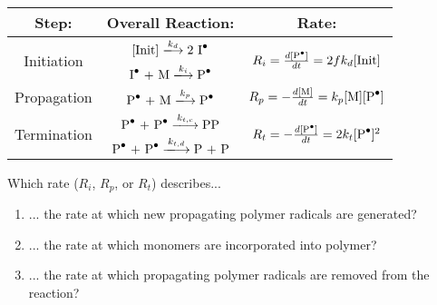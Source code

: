 \begin{activity}
\begin{model}
	\begin{center}
		\renewcommand{\arraystretch}{2}
		\begin{tabular}{c c c}
			\textbf{Step:} & \textbf{Overall Reaction:} & \textbf{Rate:}\\\hline
			\multirow{2}{*}{Initiation} & $[\text{Init}] \xlongrightarrow{k_d} \text{2 \ce{I^.}}$ & \multirow{2}{*}{$ R_i = \frac{d\text{[\ce{P^.}]}}{dt} = 2fk_d[\text{Init}]$}\\
			 & $\text{\ce{I^.} + M} \xlongrightarrow{k_i} \text{\ce{P^.}}$ & \\\hline
			Propagation & $\text{\ce{P^.} + M} \xlongrightarrow{k_p} \text{\ce{P^.}}$ & $R_p = -\frac{d[\text{M}]}{dt} = k_p\text{[M][\ce{P^.}]}$\\\hline
			\multirow{2}{*}{Termination} & $\text{\ce{P^.} + \ce{P^.}} \xlongrightarrow{k_{t,c}} \text{\ce{PP}}$ & \multirow{2}{*}{$R_t = -\frac{d[\text{\ce{P^.}}]}{dt} = 2k_t [\text{\ce{P^.}}]^2$}\\
			& $\text{\ce{P^.} + \ce{P^.}} \xlongrightarrow{k_{t,d}} \text{P + P}$ & \\\hline
		\end{tabular}
	\end{center}
	\vspace{6pt}

\end{model}

\begin{ctqs}

	\question Which rate ($R_i$, $R_p$, or $R_t$) describes...
	
		\begin{enumerate}
			\item ... the rate at which new propagating polymer radicals are generated?
			
				\begin{solution}[0.5in]
				\end{solution}
				
			\item ... the rate at which monomers are incorporated into polymer?
			
				\begin{solution}[0.5in]
				\end{solution}
				
			\item ... the rate at which propagating polymer radicals are removed from the reaction?
			
				\begin{solution}[0.5in]
				\end{solution}
				

\end{enumerate}
\end{ctqs}
\end{activity}
